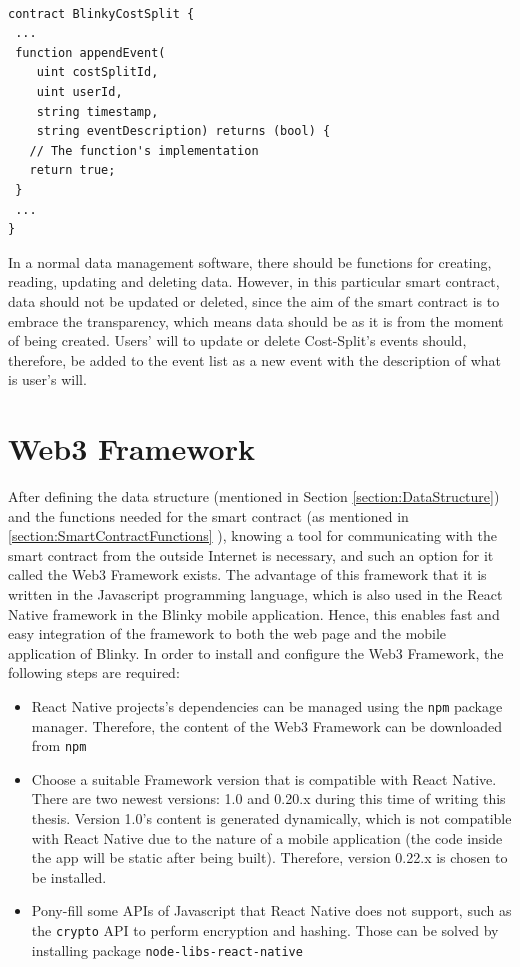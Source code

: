 \documentclass[twoside,numperchapter]{tutthesis} %
\begin{document}
\begin{lstlisting}[float,caption={Skeleton implementation of function \texttt{appendEvent}.},label={lst:appendEventFunction},language=Solidity]

contract BlinkyCostSplit {
 ...
 function appendEvent(
    uint costSplitId,
    uint userId,
    string timestamp,
    string eventDescription) returns (bool) {
   // The function's implementation
   return true;
 }
 ...
}

\end{lstlisting}

In a normal data management software, there should be functions for creating, reading, updating and deleting data. However, in this particular smart contract, data should not be updated or deleted, since the aim of the smart contract is to embrace the transparency, which means data should be as it is from the moment of being created. Users' will to update or delete Cost-Split's events should, therefore, be added to the event list as a new event with the description of what is user's will.

\section{Web3 Framework}

After defining the data structure (mentioned in Section \ref{section:DataStructure}) and the functions needed for the smart contract (as mentioned in \ref{section:SmartContractFunctions} ), knowing a tool for communicating with the smart contract from the outside Internet is necessary, and such an option for it called the Web3 Framework exists. The advantage of this framework that it is written in the Javascript programming language, which is also used in the React Native framework in the Blinky mobile application. Hence, this enables fast and easy integration of the framework to both the web page and the mobile application of Blinky. In order to install and configure the Web3 Framework, the following steps are required:

\begin{itemize}
    \item React Native projects's dependencies can be managed using the \texttt{npm} package manager. Therefore, the content of the Web3 Framework can be downloaded from \texttt{npm}
    \item Choose a suitable Framework version that is compatible with React Native. There are two newest versions: 1.0 and 0.20.x during this time of writing this thesis. Version 1.0's content is generated dynamically, which is not compatible with React Native due to the nature of a mobile application (the code inside the app will be static after being built). Therefore, version 0.22.x is chosen to be installed.
    \item Pony-fill some APIs of Javascript that React Native does not support, such as the \texttt{crypto} API to perform encryption and hashing. Those can be solved by installing package \texttt{node-libs-react-native}
\end{itemize}
\end{document}
